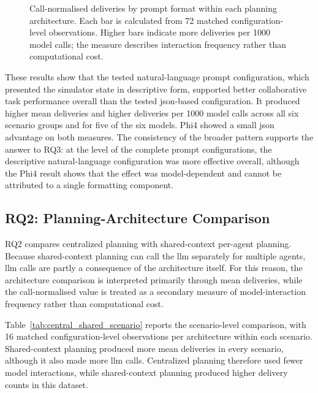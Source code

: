 \begin{figure}[H]
\centering
\ChartPromptArchitecture
\caption{Call-normalised deliveries by prompt format within each planning architecture. Each bar is calculated from 72 matched configuration-level observations. Higher bars indicate more deliveries per 1000 model calls; the measure describes interaction frequency rather than computational cost.}
\label{fig:prompt_efficiency_coordination_architecture}
\end{figure}

These results show that the tested natural-language prompt configuration, which presented the simulator state in descriptive form, supported better collaborative task performance overall than the tested \gls{json}-based configuration. It produced higher mean deliveries and higher deliveries per 1000 model calls across all six scenario groups and for five of the six models. Phi4 showed a small \gls{json} advantage on both measures. The consistency of the broader pattern supports the answer to RQ3: at the level of the complete prompt configurations, the descriptive natural-language configuration was more effective overall, although the Phi4 result shows that the effect was model-dependent and cannot be attributed to a single formatting component.

\subsection{RQ2: Planning-Architecture Comparison}
\label{sec:results_architecture}

RQ2 compares centralized planning with shared-context per-agent planning. Because shared-context planning can call the \gls{llm} separately for multiple agents, \gls{llm} calls are partly a consequence of the architecture itself. For this reason, the architecture comparison is interpreted primarily through mean deliveries, while the call-normalised value is treated as a secondary measure of model-interaction frequency rather than computational cost.

Table~\ref{tab:central_shared_scenario} reports the scenario-level comparison, with 16 matched configuration-level observations per architecture within each scenario. Shared-context planning produced more mean deliveries in every scenario, although it also made more \gls{llm} calls. Centralized planning therefore used fewer model interactions, while shared-context planning produced higher delivery counts in this dataset.

